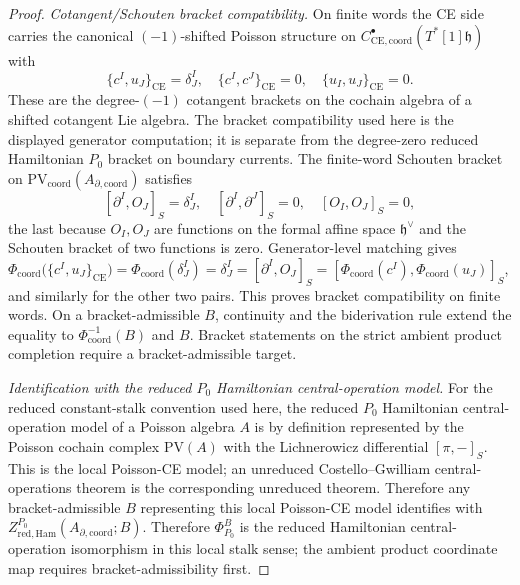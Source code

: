 \documentclass[11pt]{memoir}
\begin{document}
\begin{proof}
	  \emph{Cotangent/Schouten bracket compatibility.} On finite words the CE side carries the canonical
  $(-1)$-shifted Poisson structure on
  \(C^\bullet_{\mathrm{CE},\mathrm{coord}}(T^*[1]\mathfrak h)\) with
  $$\{c^I,u_J\}_{\mathrm{CE}}=\delta^I_J,\quad
    \{c^I,c^J\}_{\mathrm{CE}}=0,\quad
    \{u_I,u_J\}_{\mathrm{CE}}=0.$$
  These are the degree-\((-1)\) cotangent brackets on the cochain
  algebra of a shifted cotangent Lie algebra. The bracket compatibility
  used here is the displayed generator computation; it is separate from
  the degree-zero reduced Hamiltonian \(P_0\) bracket on boundary currents.
	  The finite-word Schouten bracket on
	  \(\mathrm{PV}_{\mathrm{coord}}(A_{\partial,\mathrm{coord}})\) satisfies
  $$[\partial^I,O_J]_S=\delta^I_J,\quad
    [\partial^I,\partial^J]_S=0,\quad
    [O_I,O_J]_S=0,$$
  the last because $O_I,O_J$ are functions on the formal affine space
  $\mathfrak h^\vee$ and the Schouten bracket of two functions is zero.
  Generator-level matching gives
	  $\Phi_{\mathrm{coord}}\bigl(\{c^I,u_J\}_{\mathrm{CE}}\bigr)
	  =\Phi_{\mathrm{coord}}(\delta^I_J)=\delta^I_J=[\partial^I,O_J]_S
	  =[\Phi_{\mathrm{coord}}(c^I),\Phi_{\mathrm{coord}}(u_J)]_S$, and
	  similarly for the other two pairs.  This proves bracket compatibility
	  on finite words.  On a bracket-admissible \(B\), continuity and the
	  biderivation rule extend the equality to
	  \(\Phi_{\mathrm{coord}}^{-1}(B)\) and \(B\).  Bracket statements on the
	  strict ambient product completion require a bracket-admissible target.

  \emph{Identification with the reduced $P_0$ Hamiltonian central-operation model.}
  For the reduced constant-stalk convention used here, the
	  reduced \(P_0\) Hamiltonian central-operation model of a Poisson algebra \(A\) is by
	  definition represented by the Poisson cochain complex
	  $\mathrm{PV}(A)$ with the Lichnerowicz differential $[\pi,-]_S$.
	  This is the local Poisson-CE model; an unreduced
		  Costello--Gwilliam central-operations theorem is the corresponding
		  unreduced theorem. Therefore
	  any bracket-admissible \(B\) representing this local Poisson-CE model
	  identifies with
		  \(Z^{P_0}_{\mathrm{red,Ham}}(A_{\partial,\mathrm{coord}};B)\).  Therefore
	  \(\Phi^B_{P_0}\) is the reduced Hamiltonian central-operation
	  isomorphism in this local stalk sense; the ambient product coordinate
	  map requires bracket-admissibility first.
\end{proof}
\end{document}
